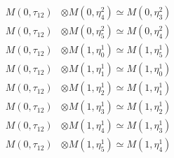 \begin{align*}
M(0,\tau_{12}) &\otimes M(0,\eta^{2}_{4}) \simeq M(0,\eta^{2}_{3}) \\
M(0,\tau_{12}) &\otimes M(0,\eta^{2}_{5}) \simeq M(0,\eta^{2}_{4}) \\
M(0,\tau_{12}) &\otimes M(1,\eta^{1}_{0}) \simeq M(1,\eta^{1}_{5}) \\
M(0,\tau_{12}) &\otimes M(1,\eta^{1}_{1}) \simeq M(1,\eta^{1}_{0}) \\
M(0,\tau_{12}) &\otimes M(1,\eta^{1}_{2}) \simeq M(1,\eta^{1}_{1}) \\
M(0,\tau_{12}) &\otimes M(1,\eta^{1}_{3}) \simeq M(1,\eta^{1}_{2}) \\
M(0,\tau_{12}) &\otimes M(1,\eta^{1}_{4}) \simeq M(1,\eta^{1}_{3}) \\
M(0,\tau_{12}) &\otimes M(1,\eta^{1}_{5}) \simeq M(1,\eta^{1}_{4}) \\
\end{align*}

